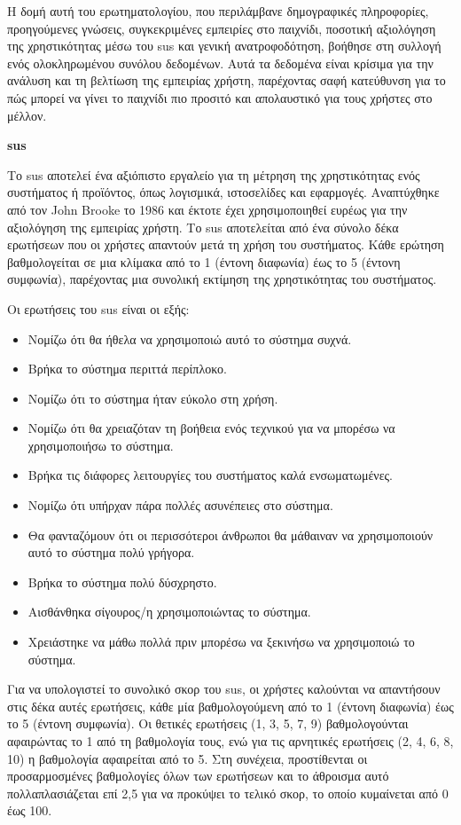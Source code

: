 Η δομή αυτή του ερωτηματολογίου, που περιλάμβανε δημογραφικές πληροφορίες, προηγούμενες γνώσεις, συγκεκριμένες εμπειρίες στο παιχνίδι, ποσοτική αξιολόγηση της χρηστικότητας μέσω του \acrshort{sus} και γενική ανατροφοδότηση, βοήθησε στη συλλογή ενός ολοκληρωμένου συνόλου δεδομένων. Αυτά τα δεδομένα είναι κρίσιμα για την ανάλυση και τη βελτίωση της εμπειρίας χρήστη, παρέχοντας σαφή κατεύθυνση για το πώς μπορεί να γίνει το παιχνίδι πιο προσιτό και απολαυστικό για τους χρήστες στο μέλλον.

\textbf{\acrfull{sus}}

Το \acrfull{sus} αποτελεί ένα αξιόπιστο εργαλείο για τη μέτρηση της χρηστικότητας ενός συστήματος ή προϊόντος, όπως λογισμικά, ιστοσελίδες και εφαρμογές. Αναπτύχθηκε από τον John Brooke το 1986 και έκτοτε έχει χρησιμοποιηθεί ευρέως για την αξιολόγηση της εμπειρίας χρήστη. Το \acrshort{sus} αποτελείται από ένα σύνολο δέκα ερωτήσεων που οι χρήστες απαντούν μετά τη χρήση του συστήματος. Κάθε ερώτηση βαθμολογείται σε μια κλίμακα από το 1 (έντονη διαφωνία) έως το 5 (έντονη συμφωνία), παρέχοντας μια συνολική εκτίμηση της χρηστικότητας του συστήματος\cite{noauthor_what_nodate}.

Οι ερωτήσεις του \acrshort{sus} είναι οι εξής:

\begin{itemize}
    \item Νομίζω ότι θα ήθελα να χρησιμοποιώ αυτό το σύστημα συχνά.
    \item Βρήκα το σύστημα περιττά περίπλοκο.
    \item Νομίζω ότι το σύστημα ήταν εύκολο στη χρήση.
    \item Νομίζω ότι θα χρειαζόταν τη βοήθεια ενός τεχνικού για να μπορέσω να χρησιμοποιήσω το σύστημα.
    \item Βρήκα τις διάφορες λειτουργίες του συστήματος καλά ενσωματωμένες.
    \item Νομίζω ότι υπήρχαν πάρα πολλές ασυνέπειες στο σύστημα.
    \item Θα φανταζόμουν ότι οι περισσότεροι άνθρωποι θα μάθαιναν να χρησιμοποιούν αυτό το σύστημα πολύ γρήγορα.
    \item Βρήκα το σύστημα πολύ δύσχρηστο.
    \item Αισθάνθηκα σίγουρος/η χρησιμοποιώντας το σύστημα.
    \item Χρειάστηκε να μάθω πολλά πριν μπορέσω να ξεκινήσω να χρησιμοποιώ το σύστημα.
\end{itemize}

Για να υπολογιστεί το συνολικό σκορ του \acrshort{sus}, οι χρήστες καλούνται να απαντήσουν στις δέκα αυτές ερωτήσεις, κάθε μία βαθμολογούμενη από το 1 (έντονη διαφωνία) έως το 5 (έντονη συμφωνία). Οι θετικές ερωτήσεις (1, 3, 5, 7, 9) βαθμολογούνται αφαιρώντας το 1 από τη βαθμολογία τους, ενώ για τις αρνητικές ερωτήσεις (2, 4, 6, 8, 10) η βαθμολογία αφαιρείται από το 5. Στη συνέχεια, προστίθενται οι προσαρμοσμένες βαθμολογίες όλων των ερωτήσεων και το άθροισμα αυτό πολλαπλασιάζεται επί 2,5 για να προκύψει το τελικό σκορ, το οποίο κυμαίνεται από 0 έως 100.

